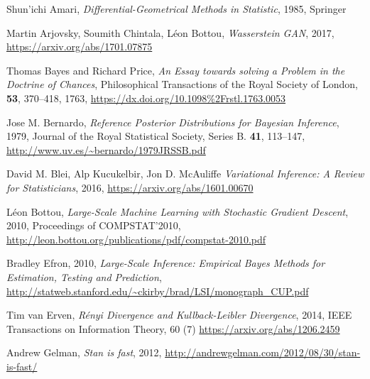 \documentclass[12pt,vu]{adammath}
\theoremstyle{plain}
\theoremstyle{definition}
\theoremstyle{remark}
\begin{document}
%
%

\begin{thebibliography}{xx}


\raggedright

  Shun'ichi Amari,
  \emph{Differential-Geometrical Methods in Statistic},
  1985,
  Springer

  Martin Arjovsky, Soumith Chintala, Léon Bottou,
  \emph{Wasserstein GAN},
  2017,
  \url{https://arxiv.org/abs/1701.07875}

  Thomas Bayes and Richard Price,
  \emph{An Essay towards solving a Problem in the Doctrine of Chances},
  Philosophical Transactions of the Royal Society of London, \textbf{53}, 370–418,
  1763,
  \url{https://dx.doi.org/10.1098%2Frstl.1763.0053}

  Jose M. Bernardo,
  \emph{Reference Posterior Distributions for Bayesian Inference},
  1979,
  Journal of the Royal Statistical Society, Series B. \textbf{41}, 113–147,
  \url{http://www.uv.es/~bernardo/1979JRSSB.pdf}

  David M. Blei, Alp Kucukelbir, Jon D. McAuliffe
  \emph{Variational Inference: A Review for Statisticians},
  2016,
  \url{https://arxiv.org/abs/1601.00670}

  L\'eon Bottou,
  \emph{Large-Scale Machine Learning with Stochastic Gradient Descent},
  2010,
  Proceedings of COMPSTAT'2010,
  \url{http://leon.bottou.org/publications/pdf/compstat-2010.pdf}

  Bradley Efron,
  2010,
  \emph{Large-Scale Inference: Empirical Bayes Methods for Estimation, Testing and Prediction},
  \url{http://statweb.stanford.edu/~ckirby/brad/LSI/monograph_CUP.pdf}

  Tim van Erven,
  \emph{Rényi Divergence and Kullback-Leibler Divergence},
  2014,
  IEEE Transactions on Information Theory, 60 (7)
  \url{https://arxiv.org/abs/1206.2459}

  Andrew Gelman,
  \emph{Stan is fast},
  2012,
  \url{http://andrewgelman.com/2012/08/30/stan-is-fast/}


\end{thebibliography}
\end{document}
